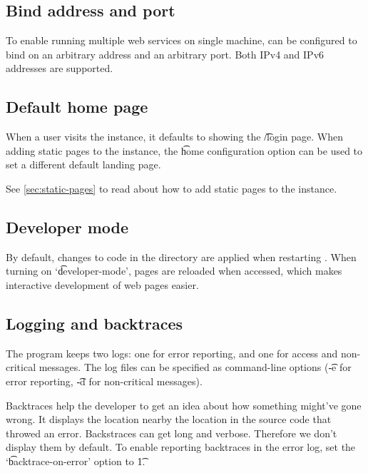 \subsection{Bind address and port}

  To enable running multiple web services on single machine, 
  can be configured to bind on an arbitrary address and an arbitrary port.
  Both IPv4 and IPv6 addresses are supported.

\subsection{Default home page}

  When a user visits the  instance, it defaults to showing
  the \t{/login} page.  When adding static pages to the 
  instance, the \t{home} configuration option can be used to set a different
  default landing page.

  See \ref{sec:static-pages} to read about how to add static pages to the
   instance.

\subsection{Developer mode}

  By default, changes to code in the  directory are
  applied when restarting .  When turning on
  `\t{developer-mode}', pages are reloaded when accessed, which makes
  interactive development of web pages easier.

\subsection{Logging and backtraces}
\label{sec:logging}

  The  program keeps two logs: one for error reporting, and
  one for access and non-critical messages.  The log files can be specified
  as command-line options (\t{-e} for error reporting, \t{-d} for
  non-critical messages).

  Backtraces help the developer to get an idea about how something might've
  gone wrong.  It displays the location nearby the location in the source code
  that throwed an error.  Backstraces can get long and verbose.  Therefore we
  don't display them by default.  To enable reporting backtraces in the error
  log, set the `\t{backtrace-on-error}' option to \t{1}.


